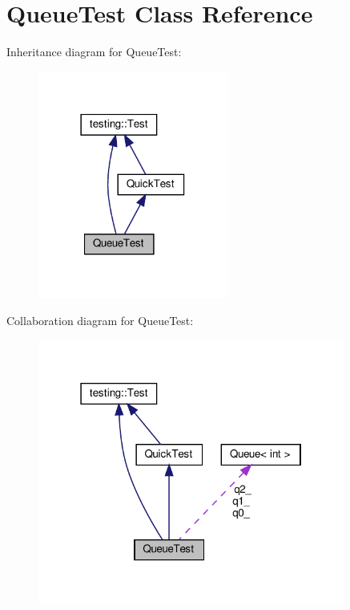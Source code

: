 \hypertarget{class_queue_test}{}\section{Queue\+Test Class Reference}
\label{class_queue_test}


Inheritance diagram for Queue\+Test\+:
\nopagebreak
\begin{figure}[H]
\begin{center}
\leavevmode
\includegraphics[width=177pt]{class_queue_test__inherit__graph}
\end{center}
\end{figure}


Collaboration diagram for Queue\+Test\+:
\nopagebreak
\begin{figure}[H]
\begin{center}
\leavevmode
\includegraphics[width=286pt]{class_queue_test__coll__graph}
\end{center}
\end{figure}
